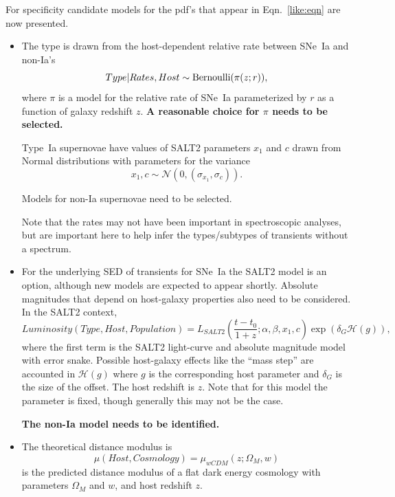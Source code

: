 \documentclass[preprint,3p]{elsarticle}
\begin{document}
For specificity candidate models for the pdf's that appear in Eqn.~\ref{like:eqn}
are now presented.
\begin{itemize}
\item The type is drawn from the host-dependent relative rate between SNe~Ia and non-Ia's 
\begin{equation}
Type | Rates, Host \sim {\rm Bernoulli}(\pi(z;r)),
\end{equation}
where $\pi$ is a model for the relative rate of SNe~Ia parameterized by $r$ as a
function of galaxy redshift $z$.  {\bf A reasonable choice for $\pi$ needs to be
selected.}

Type~Ia supernovae have values of SALT2 parameters
$x_1$ and $c$ drawn from Normal distributions
with parameters for the variance
\begin{equation}
x_1, c \sim \mathcal{N}(0, (\sigma_{x_1}, \sigma_c)).
\end{equation}

Models for non-Ia supernovae need to be selected. 

Note that the rates may not have been important in spectroscopic analyses, but are important here to help infer the types/subtypes of transients without
a spectrum.
\item For the underlying SED of transients for SNe~Ia the SALT2 model
is an option, although new models are expected to appear shortly.  Absolute magnitudes
that depend on host-galaxy properties also need to be considered. 
In the SALT2 context,
\begin{equation}
Luminosity(Type
, Host, Population)= L_{SALT2}\left(\frac{t-t_0}{1+z}; \alpha, \beta, x_1, c\right) \exp{\left(\delta_G\mathcal{H}(g)\right)},
\end{equation}
where the first  term is the SALT2 light-curve and absolute magnitude
model with error snake.  Possible host-galaxy effects like the ``mass step'' are
accounted in $\mathcal{H}(g)$ where $g$ is the corresponding host parameter
and $\delta_G$ is the size of the offset.  The host redshift is $z$.
Note that for this model the parameter is fixed, though
generally this may not be the case.

{\bf The non-Ia model needs to be identified.}
\item The theoretical distance modulus is
\begin{equation}
\mu(Host, Cosmology) = \mu_{wCDM}(z; \Omega_M, w)
\end{equation}
is the predicted distance modulus of a flat dark energy cosmology
with parameters $\Omega_M$ and $w$, and host redshift $z$.


\end{itemize}
\end{document}
